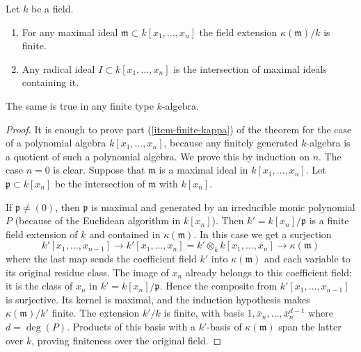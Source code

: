 \begin{theorem}
\label{theorem-nullstellensatz}
Let $k$ be a field.
\begin{enumerate}
\item
\label{item-finite-kappa}
For any maximal ideal $\mathfrak m \subset k[x_1, \ldots, x_n]$
the field extension $\kappa(\mathfrak m)/k$ is finite.
\item
\label{item-polynomial-ring-Jacobson}
Any radical ideal $I \subset k[x_1, \ldots, x_n]$
is the intersection of maximal ideals containing it.
\end{enumerate}
The same is true in any finite type $k$-algebra.
\end{theorem}

\begin{proof}
It is enough to prove part (\ref{item-finite-kappa}) of
the theorem for the case of a polynomial
algebra $k[x_1, \ldots, x_n]$, because any finitely generated
$k$-algebra is a quotient of such a polynomial algebra.
We prove this by induction on $n$. The case $n = 0$ is clear.
Suppose that $\mathfrak m$ is a maximal ideal in $k[x_1, \ldots, x_n]$.
Let $\mathfrak p \subset k[x_n]$ be the intersection
of $\mathfrak m$ with $k[x_n]$.

\medskip\noindent
If $\mathfrak p \not = (0)$,
then $\mathfrak p$ is maximal and generated by an irreducible
monic polynomial $P$ (because of the Euclidean algorithm
in $k[x_n]$). Then
$k' = k[x_n]/\mathfrak p$ is a finite field extension of $k$
and contained in $\kappa(\mathfrak m)$. In this case
we get a surjection
$$
k'[x_1, \ldots, x_{n-1}]
\to
k'[x_1, \ldots, x_n] =
k' \otimes_k k[x_1, \ldots, x_n]
\longrightarrow
\kappa(\mathfrak m)
$$
where the last map sends the coefficient field $k'$ into
$\kappa(\mathfrak m)$ and each variable to its original residue
class. The image of $x_n$ already belongs to this coefficient field:
it is the class of $x_n$ in $k'=k[x_n]/\mathfrak p$. Hence the
composite from $k'[x_1,\ldots,x_{n-1}]$ is surjective. Its kernel
is maximal, and the induction hypothesis makes
$\kappa(\mathfrak m)/k'$ finite. The extension $k'/k$ is finite,
with basis $1,\overline{x}_n,\ldots,\overline{x}_n^{d-1}$ where
$d=\deg(P)$. Products of this basis with a $k'$-basis of
$\kappa(\mathfrak m)$ span the latter over $k$, proving finiteness
over the original field.


\end{proof}
